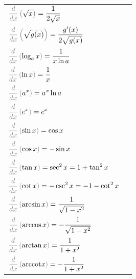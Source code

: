 \documentclass[a4paper,12pt]{article}
\begin{document}
\begin{tabular}{ll}

$\displaystyle {\color{gray}\frac{d}{dx} \left( {\color{black}{\sqrt{x}}}\right) } = \frac{1}{2\sqrt{x}}$ \\
$\displaystyle {\color{gray}\frac{d}{dx} \left( {\color{black}{\sqrt{g(x)}}}\right) } = \frac{g'(x)}{2\sqrt{g(x)}}$ \\
\hline
$\displaystyle {\color{gray}\frac{d}{dx} \left( {\color{black}{\log_a x}}\right) } = \frac{1}{x \ln a}$ \\
$\displaystyle {\color{gray}\frac{d}{dx} \left( {\color{black}{\ln x}}\right) } = \frac{1}{x}$ \\
$\displaystyle {\color{gray}\frac{d}{dx} \left( {\color{black}{a^x}}\right) } = a^x \ln a$ \\
$\displaystyle {\color{gray}\frac{d}{dx} \left( {\color{black}{e^x}}\right) } = e^x$ \\
\hline
$\displaystyle {\color{gray}\frac{d}{dx} \left( {\color{black}{\sin x}}\right) } = \cos x$ \\
$\displaystyle {\color{gray}\frac{d}{dx} \left( {\color{black}{\cos x}}\right) } = -\sin x$ \\
$\displaystyle {\color{gray}\frac{d}{dx} \left( {\color{black}{\tan x}}\right) } = \sec^2 x=1+\tan^2 x$ \\
$\displaystyle {\color{gray}\frac{d}{dx} \left( {\color{black}{\cot x}}\right) } = -\csc^2 x=-1-\cot^2 x$ \\
\hline
$\displaystyle {\color{gray}\frac{d}{dx} \left( {\color{black}{\arcsin x}}\right) } = \frac{1}{\sqrt{1-x^2}}$ \\
$\displaystyle {\color{gray}\frac{d}{dx} \left( {\color{black}{\arccos x}}\right) } = -\frac{1}{\sqrt{1-x^2}}$ \\
$\displaystyle {\color{gray}\frac{d}{dx} \left( {\color{black}{\arctan x}}\right) } = \frac{1}{1+x^2}$ \\
$\displaystyle {\color{gray}\frac{d}{dx} \left( {\color{black}{\text{arccot} x}}\right) } = -\frac{1}{1+x^2}$

\end{tabular}
\end{document}

